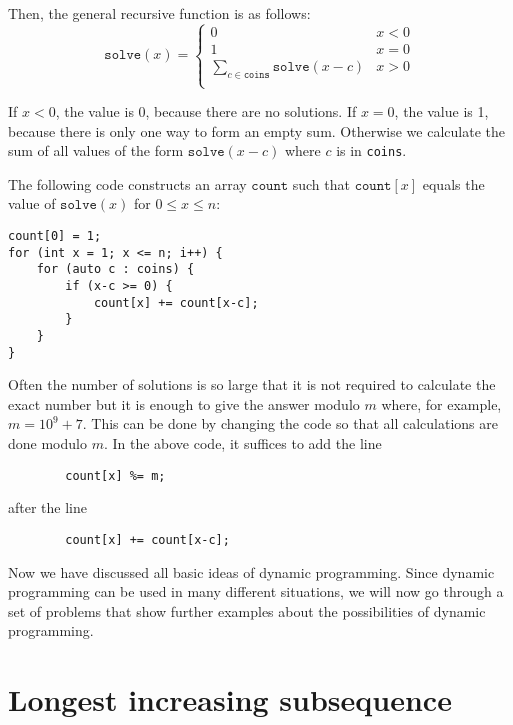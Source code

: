 Then, the general recursive function is as follows:
\begin{equation*}
    \texttt{solve}(x) = \begin{cases}
               0               & x < 0\\
               1               & x = 0\\
               \sum_{c \in \texttt{coins}} \texttt{solve}(x-c) & x > 0 \\
           \end{cases}
\end{equation*}

If $x<0$, the value is 0, because there are no solutions.
If $x=0$, the value is 1, because there is only one way
to form an empty sum.
Otherwise we calculate the sum of all values
of the form $\texttt{solve}(x-c)$ where $c$ is in \texttt{coins}.

The following code constructs an array
$\texttt{count}$ such that
$\texttt{count}[x]$ equals
the value of $\texttt{solve}(x)$
for $0 \le x \le n$:

\begin{lstlisting}
count[0] = 1;
for (int x = 1; x <= n; i++) {
    for (auto c : coins) {
        if (x-c >= 0) {
            count[x] += count[x-c];
        }
    }
}
\end{lstlisting}

Often the number of solutions is so large
that it is not required to calculate the exact number
but it is enough to give the answer modulo $m$
where, for example, $m=10^9+7$.
This can be done by changing the code so that
all calculations are done modulo $m$.
In the above code, it suffices to add the line
\begin{lstlisting}
        count[x] %= m;
\end{lstlisting}
after the line
\begin{lstlisting}
        count[x] += count[x-c];
\end{lstlisting}

Now we have discussed all basic
ideas of dynamic programming.
Since dynamic programming can be used
in many different situations,
we will now go through a set of problems
that show further examples about the
possibilities of dynamic programming.

\section{Longest increasing subsequence}


